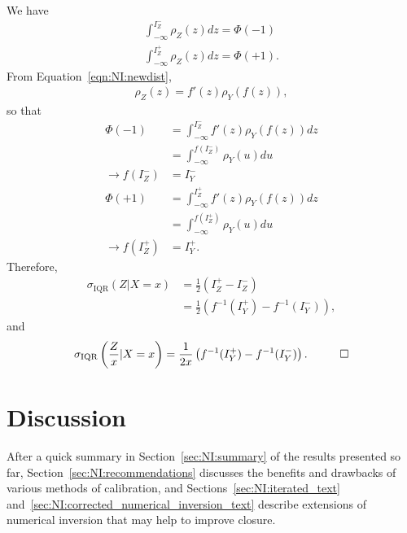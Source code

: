 We have
\begin{align}
\int_{-\infty}^{I_Z^-}\rho_Z(z)dz = \Phi(-1)\\
\int_{-\infty}^{I_Z^+}\rho_Z(z)dz = \Phi(+1).
\end{align}
From Equation~\ref{eqn:NI:newdist},
\begin{align}
\rho_Z(z) = f'(z)\rho_Y(f(z)),
\end{align}
so that
\begin{align}
\Phi(-1) &= \int_{-\infty}^{I_Z^-}f'(z)\rho_Y(f(z))dz\nonumber\\
&=\int_{-\infty}^{f(I_Z^-)}\rho_Y(u)du\nonumber\\
\rightarrow f(I_Z^-) &= I_Y^-\\
\Phi(+1) &= \int_{-\infty}^{I_Z^+}f'(z)\rho_Y(f(z))dz\nonumber\\
&=\int_{-\infty}^{f(I_Z^+)}\rho_Y(u)du\nonumber\\
\rightarrow f(I_Z^+) &= I_Y^+.
\end{align}
Therefore,
\begin{align}
\sigma_\text{IQR}(Z|X=x) &= \frac{1}{2}\left(I_Z^+-I_Z^-\right)\nonumber\\
&=\frac{1}{2}\left(f^{-1}(I_Y^+)-f^{-1}(I_Y^-)\right),
\end{align}
and
\begin{align}
\sigma_\text{IQR}\left(\frac{Z}{x}|X=x\right)=\frac{1}{2x}\left(f^{-1}(I_Y^+)-f^{-1}(I_Y^-)\right).\hspace{1 cm}\Box
\label{eqn:NI:resolutionmedian_text}
\end{align}
\newpage
\section{Discussion}
\label{sec:NI:discussion}

After a quick summary in Section~\ref{sec:NI:summary} of the results presented so far, Section~\ref{sec:NI:recommendations} discusses the benefits and drawbacks of various methods of calibration, and Sections~\ref{sec:NI:iterated_text} and~\ref{sec:NI:corrected_numerical_inversion_text} describe extensions of numerical inversion that may help to improve closure.

